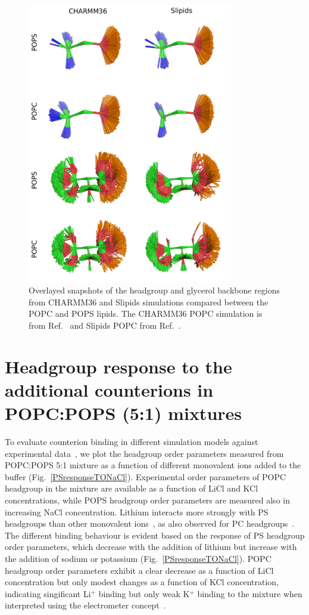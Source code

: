 \documentclass[journal=jpcbfk,manuscript=article]{achemso}
\begin{document}
\begin{figure}[]
  \centering
  \includegraphics[width=9.0cm]{../Figs/figS8_POPC.png}
  \caption{\label{HGandGLYstructuresPSPC}
    Overlayed snapshots of the headgroup and glycerol backbone regions 
    from CHARMM36 and Slipids simulations compared between the POPC and POPS lipids.
    The CHARMM36 POPC simulation is from Ref.~ and Slipids POPC from Ref.~.
  }
\end{figure}




\pagebreak

\section{Headgroup response to the additional counterions in POPC:POPS (5:1) mixtures}\label{mixtureTOadditionalCIs}
To evaluate counterion binding in different simulation models against experimental data~\cite{roux90},
we plot the headgroup order parameters measured from POPC:POPS 5:1 mixture
as a function of different monovalent ions added to the buffer (Fig.~\ref{PSresponseTONaCl}). 
Experimental order parameters of POPC headgroup in the mixture are available as a function
of LiCl and KCl concentrations, while POPS headgroup order parameters are measured also
in increasing NaCl concentration. Lithium interacts more strongly with PS headgroups than other monovalent 
ions~\cite{hauser83,hauser85,roux86,mattai89,roux90}, as also observed for PC headgroups~\cite{cevc90}. 
The different binding behaviour is evident based on the response of PS headgroup order parameters, which decrease with the addition of lithium 
but increase with the addition of sodium or potassium (Fig.~\ref{PSresponseTONaCl}). 
POPC headgroup order parameters exhibit a clear decrease as a function of LiCl concentration
but only modest changes as a function of KCl concentration, indicating singificant 
Li$^+$ binding but only weak K$^+$ binding to the mixture when interpreted using the
electrometer concept~\cite{akutsu81,altenbach84,seelig87}.
\end{document}
